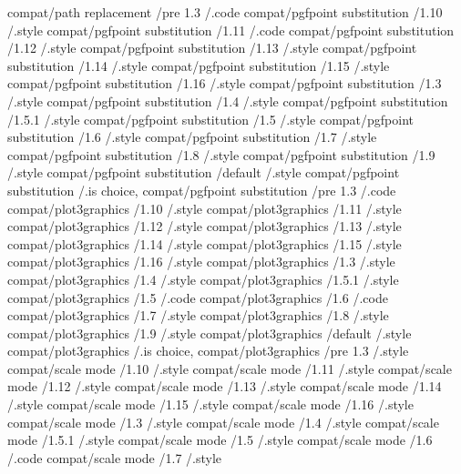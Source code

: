 compat/path replacement        /pre 1.3     /.code
compat/pgfpoint substitution   /1.10        /.style
compat/pgfpoint substitution   /1.11        /.code
compat/pgfpoint substitution   /1.12        /.style
compat/pgfpoint substitution   /1.13        /.style
compat/pgfpoint substitution   /1.14        /.style
compat/pgfpoint substitution   /1.15        /.style
compat/pgfpoint substitution   /1.16        /.style
compat/pgfpoint substitution   /1.3         /.style
compat/pgfpoint substitution   /1.4         /.style
compat/pgfpoint substitution   /1.5.1       /.style
compat/pgfpoint substitution   /1.5         /.style
compat/pgfpoint substitution   /1.6         /.style
compat/pgfpoint substitution   /1.7         /.style
compat/pgfpoint substitution   /1.8         /.style
compat/pgfpoint substitution   /1.9         /.style
compat/pgfpoint substitution   /default     /.style
compat/pgfpoint substitution                /.is choice, 
compat/pgfpoint substitution   /pre 1.3     /.code
compat/plot3graphics           /1.10        /.style
compat/plot3graphics           /1.11        /.style
compat/plot3graphics           /1.12        /.style
compat/plot3graphics           /1.13        /.style
compat/plot3graphics           /1.14        /.style
compat/plot3graphics           /1.15        /.style
compat/plot3graphics           /1.16        /.style
compat/plot3graphics           /1.3         /.style
compat/plot3graphics           /1.4         /.style
compat/plot3graphics           /1.5.1       /.style
compat/plot3graphics           /1.5         /.code
compat/plot3graphics           /1.6         /.code
compat/plot3graphics           /1.7         /.style
compat/plot3graphics           /1.8         /.style
compat/plot3graphics           /1.9         /.style
compat/plot3graphics           /default     /.style
compat/plot3graphics                        /.is choice, 
compat/plot3graphics           /pre 1.3     /.style
compat/scale mode              /1.10        /.style
compat/scale mode              /1.11        /.style
compat/scale mode              /1.12        /.style
compat/scale mode              /1.13        /.style
compat/scale mode              /1.14        /.style
compat/scale mode              /1.15        /.style
compat/scale mode              /1.16        /.style
compat/scale mode              /1.3         /.style
compat/scale mode              /1.4         /.style
compat/scale mode              /1.5.1       /.style
compat/scale mode              /1.5         /.style
compat/scale mode              /1.6         /.code
compat/scale mode              /1.7         /.style
